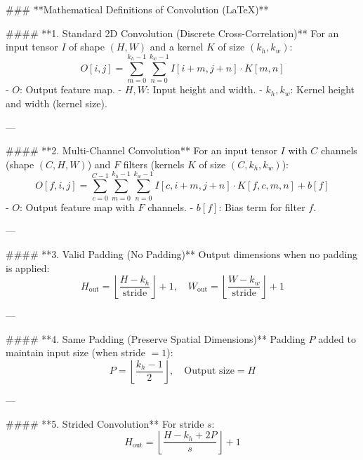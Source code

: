 ### **Mathematical Definitions of Convolution (LaTeX)**  

#### **1. Standard 2D Convolution (Discrete Cross-Correlation)**  
For an input tensor \( I \) of shape \( (H, W) \) and a kernel \( K \) of size \( (k_h, k_w) \):  
$$
O[i, j] = \sum_{m=0}^{k_h-1} \sum_{n=0}^{k_w-1} I[i+m, j+n] \cdot K[m, n]
$$  
- \( O \): Output feature map.  
- \( H, W \): Input height and width.  
- \( k_h, k_w \): Kernel height and width (kernel size).  

---

#### **2. Multi-Channel Convolution**  
For an input tensor \( I \) with \( C \) channels (shape \( (C, H, W) \)) and \( F \) filters (kernels \( K \) of size \( (C, k_h, k_w) \)):  
$$
O[f, i, j] = \sum_{c=0}^{C-1} \sum_{m=0}^{k_h-1} \sum_{n=0}^{k_w-1} I[c, i+m, j+n] \cdot K[f, c, m, n] + b[f]
$$  
- \( O \): Output feature map with \( F \) channels.  
- \( b[f] \): Bias term for filter \( f \).  

---

#### **3. Valid Padding (No Padding)**  
Output dimensions when no padding is applied:  
$$
H_{\text{out}} = \left\lfloor \frac{H - k_h}{\text{stride}} \right\rfloor + 1, \quad
W_{\text{out}} = \left\lfloor \frac{W - k_w}{\text{stride}} \right\rfloor + 1
$$  

---

#### **4. Same Padding (Preserve Spatial Dimensions)**  
Padding \( P \) added to maintain input size (when stride \(=1\)):  
$$
P = \left\lfloor \frac{k_h - 1}{2} \right\rfloor, \quad \text{Output size} = H
$$  

---

#### **5. Strided Convolution**  
For stride \( s \):  
$$
H_{\text{out}} = \left\lfloor \frac{H - k_h + 2P}{s} \right\rfloor + 1
$$  
